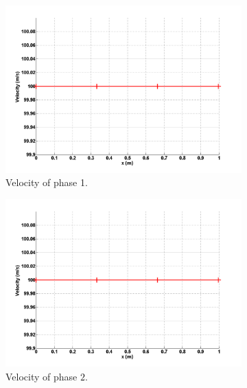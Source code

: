 %
\begin{figure}[H]
        \centering
        \begin{subfigure}[b]{0.495\textwidth}
                \centering
                \includegraphics[width=\textwidth]{figures/SEM/liquid_velocity.png}
                \caption{Velocity of phase 1.}
                \label{ig:vel-1-7-eqn-sect4}
        \end{subfigure}%
        \begin{subfigure}[b]{0.495\textwidth}
                \centering
                \includegraphics[width=\textwidth]{figures/SEM/vapor_velocity.png}
                \caption{Velocity of phase $2$.}
                \label{ig:vel-2-7-eqn-sect4}
        \end{subfigure}
        \caption{\label{fig:vel-7-sect4}}
\end{figure}
